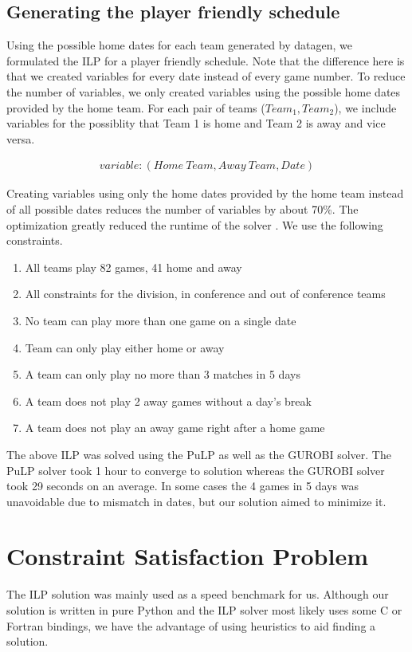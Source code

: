 \documentclass{article}
\begin{document}
	\subsection{Generating the player friendly schedule}
	Using the possible home dates for each team generated by datagen, we formulated the ILP for a player friendly schedule.  Note that the difference here is that we created variables for every date instead of every game number.  To reduce the number of variables, we only created variables using the possible home dates provided by the home team. For each pair of teams ($Team_1, Team_2$), we include variables for the possiblity that Team 1 is home and Team 2 is away and vice versa.

	\begin{eqnarray*}
		variable : (Home \ Team, Away \ Team, Date)
	\end{eqnarray*}

	Creating variables using only the home dates provided by the home team instead of all possible dates reduces the number of variables by about 70\%. The optimization greatly reduced the runtime of the solver . We use the following constraints.
	\begin{enumerate}
		\item All teams play 82 games, 41 home and away
		\item All constraints for the division, in conference and out of conference teams
		\item No team can play more than one game on a single date
		\item Team can only play either home or away
		\item A team can only play no more than 3 matches in 5 days
		\item A team does not play 2 away games without a day's break
		\item A team does not play an away game right after a home game
	\end{enumerate}
	The above ILP was solved using the PuLP as well as the GUROBI solver. The PuLP solver took 1 hour to converge to solution whereas the GUROBI solver took 29 seconds on an average. In some cases the 4 games in 5 days was unavoidable due to mismatch in dates, but our solution aimed to minimize it.

	\section{Constraint Satisfaction Problem}
	The ILP solution was mainly used as a speed benchmark for us. Although our solution is written in pure Python and the ILP solver most likely uses some C or Fortran bindings, we have the advantage of using heuristics to aid finding a solution.
\end{document}
